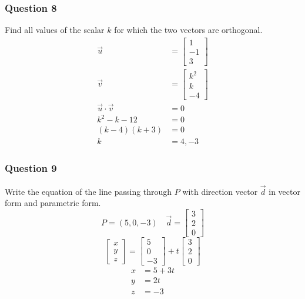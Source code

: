 \documentclass{math}
\begin{document}
\subsubsection*{Question 8}
Find all values of the scalar \( k \) for which the two vectors are orthogonal.
\begin{align*}
  \vec{u} &= \begin{bmatrix}1 \\ -1 \\ 3\end{bmatrix} \\
  \vec{v} &= \begin{bmatrix}k^2 \\ k \\ -4\end{bmatrix} \\
  \vec{u}\cdot\vec{v} &= 0 \\
  k^2-k-12 &= 0 \\
  (k-4)(k+3) &= 0 \\
  k &= 4,-3
\end{align*}

\subsubsection*{Question 9}
Write the equation of the line passing through \( P \) with direction vector
\( \vec{d} \) in vector form and parametric form.
\[ P = (5,0,-3) \quad \vec{d} = \begin{bmatrix}3 \\ 2 \\ 0\end{bmatrix} \]
\[ \begin{bmatrix}x \\ y \\ z\end{bmatrix} =
  \begin{bmatrix}5 \\ 0 \\ -3\end{bmatrix}+
  t\begin{bmatrix}3 \\ 2 \\ 0\end{bmatrix} \]
\begin{align*}
  x &= 5+3t \\
  y &= 2t \\
  z &= -3
\end{align*}
\end{document}

